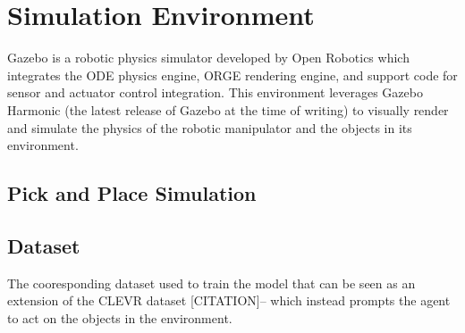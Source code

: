 \section{Simulation Environment} \label{se:gazebo_harmonic_robotics_simulator}
    Gazebo is a robotic physics simulator developed by Open Robotics which integrates the ODE physics engine, ORGE rendering engine, and support code for sensor and actuator control integration. This environment leverages Gazebo Harmonic (the latest release of Gazebo at the time of writing) to visually render and simulate the physics of the robotic manipulator and the objects in its environment. 
\subsection{Pick and Place Simulation}
\subsection{Dataset}
The cooresponding dataset used to train the model that can be seen as an extension of the CLEVR dataset [CITATION]-- which instead prompts the agent to act on the objects in the environment.


